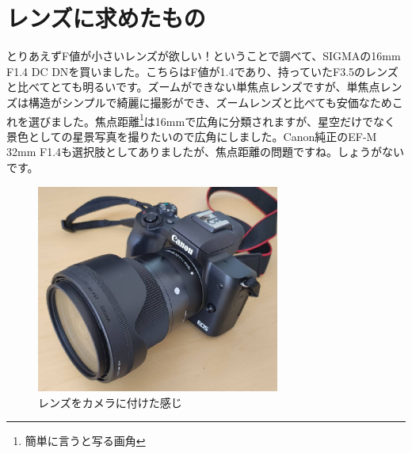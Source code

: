 \documentclass[supernova_2023]{subfiles}
\begin{document}
\section{レンズに求めたもの}
とりあえずF値が小さいレンズが欲しい！ということで調べて、SIGMAの16mm F1.4 DC DNを買いました。こちらはF値が1.4であり、持っていたF3.5のレンズと比べてとても明るいです。ズームができない単焦点レンズですが、単焦点レンズは構造がシンプルで綺麗に撮影ができ、ズームレンズと比べても安価なためこれを選びました。焦点距離\footnote{簡単に言うと写る画角}は16mmで広角に分類されますが、星空だけでなく景色としての星景写真を撮りたいので広角にしました。Canon純正のEF-M 32mm F1.4も選択肢としてありましたが、焦点距離の問題ですね。しょうがないです。
\begin{figure}
\begin{center}
  \includegraphics[width=8cm]{figures/Maruyama/don.jpg}
\caption{レンズをカメラに付けた感じ}
\end{center}
\end{figure}
\end{document}
